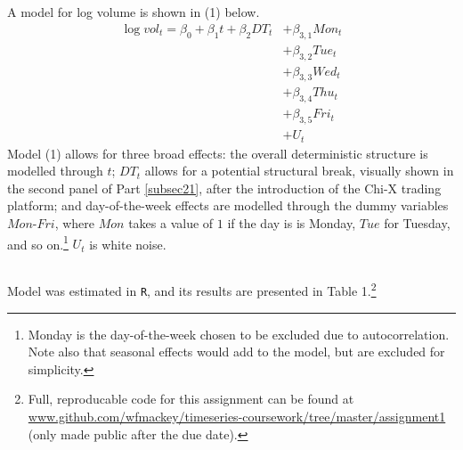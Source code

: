 \documentclass{article}\usepackage[]{graphicx}\usepackage[]{color}
\begin{document}
\subsection{}\label{subsec22}
A model for log volume is shown in (1) below.
    \begin{align*} \label{eq22} 
    \log{vol_t}  = \beta_{0} + \beta_{1} t + \beta_{2} DT_{t} &+ \beta_{3,1} Mon_{t} \tag*{(1)} \\ 
                                                              &+ \beta_{3,2} Tue_{t} \\
                                                              &+ \beta_{3,3} Wed_{t} \\
                                                              &+ \beta_{3,4} Thu_{t} \\
                                                              &+ \beta_{3,5} Fri_{t} \\
                                                      &+ U_{t}
    \end{align*}
  Model (1) allows for three broad effects: the overall deterministic structure is modelled through $t$; $DT_{t}$ allows for a potential structural break, visually shown in the second panel of Part \ref{subsec21}, after the introduction of the Chi-X trading platform; and day-of-the-week effects are modelled through the dummy variables $Mon$-$Fri$, where $Mon$ takes a value of $1$ if the day is is Monday, $Tue$ for Tuesday, and so on.\footnote{Monday is the day-of-the-week chosen to be excluded due to autocorrelation. Note also that seasonal effects would add to the model, but are excluded for simplicity.} $U_{t}$ is white noise.





\newpage
\subsection{} \label{subsec23} %

  Model \label{eq22} was estimated in \texttt{R}, and its results are presented in Table 1.\footnote{Full, reproducable code for this assignment can be found at  \url{www.github.com/wfmackey/timeseries-coursework/tree/master/assignment1} (only made public after the due date).}
\end{document}
